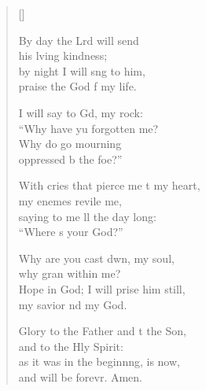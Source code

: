 \begin{verse}[\versewidth]
\begin{patverse}
By day the Lrd will send\Med\\
his lving kindness;\\
by night I will s\pointup{\i}ng to him,\Med\\
praise the God f my life.

I will say to Gd, my rock:\Med\\
“Why have yu forgotten me?\\
Why do  go mourning\Med\\
oppressed b the foe?”

With cries that pierce me t my heart,\Med\\
my enem\pointup{\i}es revile me,\\
saying to me ll the day long:\Med\\
“Where \pointup{\i}s your God?”

Why are you cast dwn, my soul,\Med\\
why gran within me?\\
Hope in God; I will prise him still,\Med\\
my savior nd my God.

Glory to the Father and t the Son,\Med\\
and to the Hly Spirit:\\
as it was in the beginn\pointup{\i}ng, is now,\Med\\
and will be forevr. Amen. 
  \end{patverse}
\end{verse}
